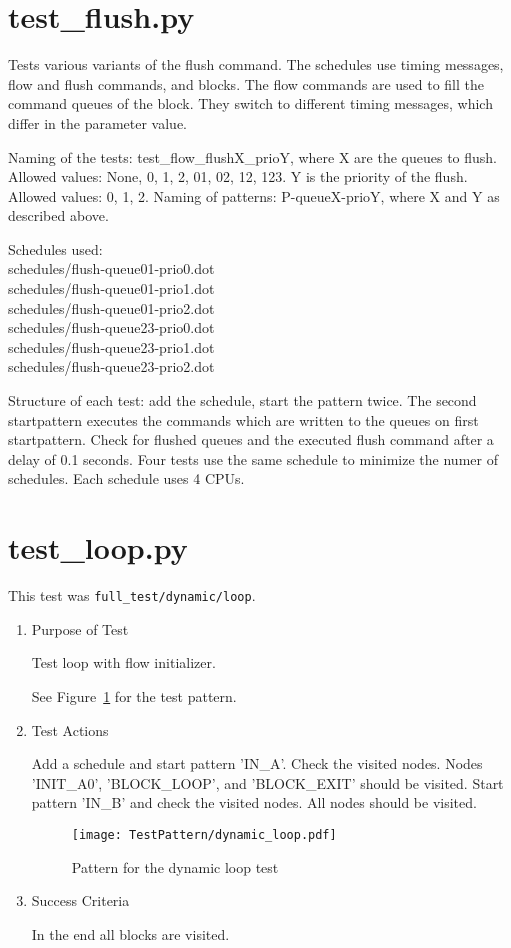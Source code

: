 \documentclass[12pt,a4paper]{report}
\begin{document}
\section{test\_flush.py}
Tests various variants of the flush command. The schedules use timing messages, flow and flush commands, and blocks.
The flow commands are used to fill the command queues of the block. They switch to different timing messages, which
differ in the parameter value.

Naming of the tests:
test\_flow\_flushX\_prioY, where
X are the queues to flush. Allowed values: None, 0, 1, 2, 01, 02, 12, 123.
Y is the priority of the flush. Allowed values: 0, 1, 2.
Naming of patterns:
P-queueX-prioY, where X and Y as described above.

Schedules used:\\
schedules/flush-queue01-prio0.dot\\
schedules/flush-queue01-prio1.dot\\
schedules/flush-queue01-prio2.dot\\
schedules/flush-queue23-prio0.dot\\
schedules/flush-queue23-prio1.dot\\
schedules/flush-queue23-prio2.dot

Structure of each test:
add the schedule, start the pattern twice. The second startpattern executes the commands which are written
to the queues on first startpattern.
Check for flushed queues and the executed flush command after a delay of 0.1 seconds.
Four tests use the same schedule to minimize the numer of schedules. Each schedule uses 4 CPUs.

\section{test\_loop.py}
This test was \texttt{full\_test/dynamic/loop}.
\begin{enumerate}
  \item Purpose of Test

        Test loop with flow initializer.

  See Figure~\ref{fig:Pattern_for_the_dynamic_loop_test} for the test pattern.
  \item Test Actions

        Add a schedule and start pattern 'IN\_A'. Check the visited nodes. Nodes 'INIT\_A0', 'BLOCK\_LOOP', and 'BLOCK\_EXIT'
        should be visited. Start pattern 'IN\_B' and check the visited nodes. All nodes should be visited.
    \begin{figure}
        \centering
        \texttt{[image: TestPattern/dynamic\_loop.pdf]}
        \caption{Pattern for the dynamic loop test}
        \label{fig:Pattern_for_the_dynamic_loop_test}
    \end{figure}
  \item Success Criteria

  In the end all blocks are visited.
\end{enumerate}
\end{document}
